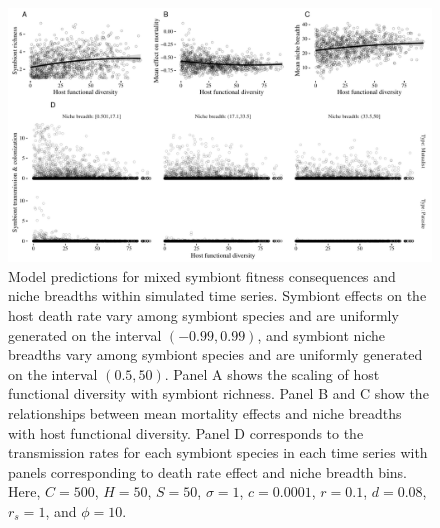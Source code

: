 \begin{figure}[ht]\centering
\includegraphics[width=\textwidth,height=\dimexpr\textheight-4\baselineskip-\abovecaptionskip-\belowcaptionskip\relax,
keepaspectratio]{figs/ch6/fig6.pdf}
\caption[Predictions when communities include symbionts with varying niche widths and fitness consequences]{Model predictions for mixed symbiont fitness consequences and niche breadths within simulated time series. Symbiont effects on the host death rate vary among symbiont species and are uniformly generated on the interval $(-0.99, 0.99)$, and symbiont niche breadths vary among symbiont species and are uniformly generated on the interval $(0.5, 50)$. Panel A shows the scaling of host functional diversity with symbiont richness. Panel B and C show the relationships between mean mortality effects and niche breadths with host functional diversity. Panel D corresponds to the transmission rates for each symbiont species in each time series with panels corresponding to death rate effect and niche breadth bins. Here, $C=500$, $H=50$, $S=50$, $\sigma = 1$, $c=0.0001$, $r=0.1$, $d=0.08$, $r_s=1$, and $\phi = 10$.}
\label{f7}
\end{figure}
